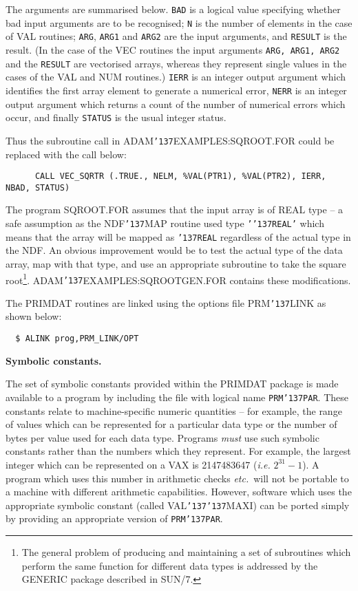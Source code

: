 \documentclass[twoside,11pt]{article}
\renewcommand{\_}{{\tt\char'137}}
\newcommand{\xref}[3]{#1}
\begin{document}
The arguments are summarised below.
{\tt BAD} is a logical value specifying whether
bad input arguments are to be recognised;
{\tt N} is the number of elements in the case of VAL routines;
{\tt ARG}, {\tt ARG1} and {\tt ARG2} are the input
arguments, and {\tt RESULT} is the result.
(In the case of the VEC routines the input
arguments {\tt ARG, ARG1, ARG2}  and the {\tt RESULT}  are vectorised arrays,
whereas they represent  single values in the cases of the VAL and NUM
routines.)
{\tt IERR} is an integer output argument which identifies the
first array element to generate a numerical error,
{\tt NERR} is an integer output argument which returns a count of the
number of numerical errors which occur,
and finally {\tt STATUS} is the usual integer status.

Thus the subroutine call in ADAM\_EXAMPLES:SQROOT.FOR could be
replaced with the call below:
{\small
\begin{verbatim}
      CALL VEC_SQRTR (.TRUE., NELM, %VAL(PTR1), %VAL(PTR2), IERR, NBAD, STATUS)
\end{verbatim}}
The program SQROOT.FOR assumes that the input array is of
REAL type -- a safe assumption as
the NDF\_MAP routine used type {\tt'\_REAL'} which means that the array
will be mapped as {\tt\_REAL} regardless of the actual type in the NDF.
An obvious improvement would be to test the actual type of the data array,
map with that type, and
use an appropriate subroutine to take the square
root\footnote{The general problem of producing and maintaining
a set of subroutines which perform the same function for different
data types is addressed by  the GENERIC package described in
\xref{SUN/7}{sun7}{}.}.
ADAM\_EXAMPLES:SQROOTGEN.FOR contains these modifications.

The PRIMDAT routines are linked using the options file PRM\_LINK as shown
below:
\begin{verbatim}
  $ ALINK prog,PRM_LINK/OPT
\end{verbatim}

{\bigskip\large\bf Symbolic constants.}

The  set of symbolic constants provided within the PRIMDAT package is
made available to a program by including the file with logical name
{\tt PRM\_PAR}.
These constants relate to machine-specific numeric quantities -- for
example, the
range of values which can be represented for a particular data type or
the number of bytes per value used for each data type.
Programs {\sl must\/}  use such symbolic constants  rather than
the numbers which they represent.
For example, the largest integer which can be represented on a VAX is
2147483647 ({\it i.e.} $2^{31}-1$).
A program which uses this number in arithmetic checks
{\it etc.}\ will not be portable to a machine with different arithmetic capabilities.
However, software which uses the appropriate symbolic constant  (called
VAL\_\_MAXI) can
be  ported  simply by providing an appropriate version of {\tt PRM\_PAR}.
\end{document}
